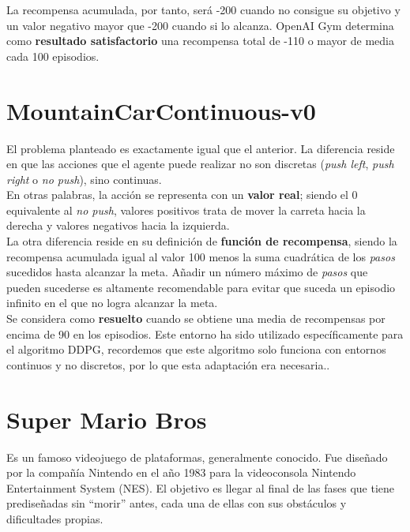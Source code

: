 \documentclass[11pt,fleqn]{book} %
\begin{document}
La recompensa acumulada, por tanto, será -200 cuando no consigue su objetivo y un valor negativo mayor que -200 cuando si lo alcanza. OpenAI Gym determina como \textbf{resultado satisfactorio} una recompensa total de -110 o mayor de media cada 100 episodios.\cite{article:mountain} \\

\section{MountainCarContinuous-v0}\label{sec:mountaincarcontinuo}

El problema planteado es exactamente igual que el anterior. La diferencia reside en que las acciones que el agente puede realizar no son discretas (\textit{push left}, \textit{push right} o \textit{no push}), sino continuas. \\

En otras palabras, la acción se representa con un \textbf{valor real}; siendo el 0 equivalente al \textit{no push}, valores positivos trata de mover la carreta hacia la derecha y valores negativos hacia la izquierda. \\

La otra diferencia reside en su definición de \textbf{función de recompensa}, siendo la recompensa acumulada igual al valor 100 menos la suma cuadrática de los \textit{pasos} sucedidos hasta alcanzar la meta. Añadir un número máximo de \textit{pasos} que pueden sucederse es altamente recomendable para evitar que suceda un episodio infinito en el que no logra alcanzar la meta. \\

Se considera como \textbf{resuelto} cuando se obtiene una media de recompensas por encima de 90 en los episodios. Este entorno ha sido utilizado específicamente para el algoritmo DDPG, recordemos que este algoritmo solo funciona con entornos continuos y no discretos, por lo que esta adaptación era necesaria.\cite{article:mountaincontinuous}.

\section{Super Mario Bros}\label{sec:mario}

Es un famoso videojuego de plataformas, generalmente conocido. Fue diseñado por la compañía Nintendo en el año 1983 para la videoconsola Nintendo Entertainment System (NES). El objetivo es llegar al final de las fases que tiene prediseñadas sin ``morir'' antes, cada una de ellas con sus obstáculos y dificultades propias.\\
\end{document}
